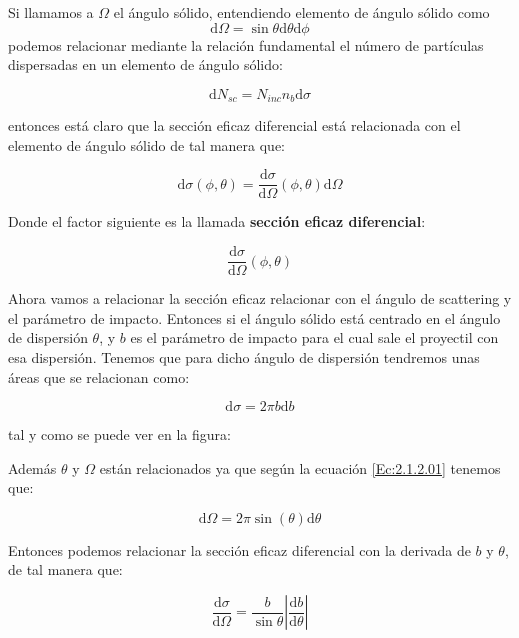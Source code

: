 \documentclass[12pt,a4paper]{book}
\newcommand{\D}{\mathrm{d}}
\begin{document}
Si llamamos a $\Omega$ el ángulo sólido, entendiendo elemento de ángulo sólido como \begin{equation}
\D \Omega = \sin \theta \D \theta \D \phi \label{Ec:2.1.2.01}
\end{equation}
podemos relacionar mediante la relación fundamental el número de partículas dispersadas en un elemento de ángulo sólido:

$$ \D N_{sc} = N_{inc} n_b \D \sigma $$

entonces está claro que la sección eficaz diferencial está relacionada con el elemento de ángulo sólido de tal manera que:

\begin{equation}
\D \sigma (\phi, \theta) = \frac{\D \sigma}{\D \Omega} (\phi, \theta) \D \Omega
\end{equation}

Donde el factor siguiente es la llamada \textbf{sección eficaz diferencial}:

\begin{equation}
\frac{\D \sigma}{\D \Omega} (\phi, \theta)
\end{equation}

Ahora vamos a relacionar la sección eficaz relacionar con el ángulo de scattering y el parámetro de impacto. Entonces si el ángulo sólido está centrado en el ángulo de dispersión $\theta$, y $b$ es el parámetro de impacto para el cual sale el proyectil con esa dispersión. Tenemos que para dicho ángulo de dispersión tendremos unas áreas que se relacionan como:

\begin{equation}
\D \sigma = 2 \pi b \D b
\end{equation}

tal y como se puede ver en la figura:

Además $\theta$ y $\Omega$ están relacionados ya que según la ecuación \ref{Ec:2.1.2.01} tenemos que:

\begin{equation}
\D \Omega = 2 \pi \sin(\theta) \D \theta
\end{equation}

Entonces podemos relacionar la sección eficaz diferencial con la derivada de $b$ y $\theta$, de tal manera que:

\begin{equation}
\frac{\D \sigma}{\D \Omega} = \dfrac{b}{\sin \theta} \left| \frac{\D b}{\D \theta} \right|
\end{equation}
\end{document}
